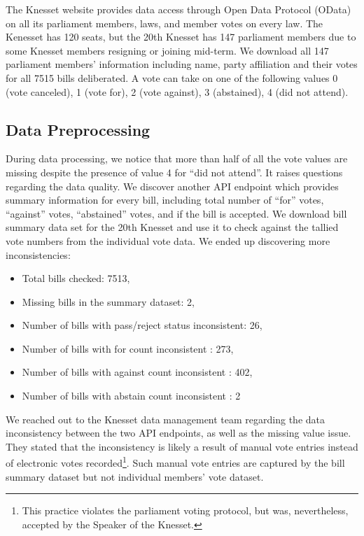 The Knesset website provides data access through Open Data Protocol (OData)
on all its parliament members, laws, and member votes on every law.
The Kenesset has 120 seats, but the 20th Knesset has 147 parliament members
due to some Knesset members resigning or joining mid-term.
We download all 147 parliament members' information including name,
party affiliation and their votes for all 7515 bills deliberated.
A vote can take on one of the following values
0 (vote canceled), 1 (vote for), 2 (vote against),
3 (abstained), 4 (did not attend).

\subsection{Data Preprocessing}
\label{subsec:data_preprocessing}

During data processing, we notice that more than half of all the vote values
are missing despite the presence of value 4 for ``did not attend''.
It raises questions regarding the data quality.
We discover another API endpoint which provides summary information for
every bill, including total number of ``for'' votes, ``against'' votes,
``abstained'' votes, and if the bill is accepted.
We download bill summary data set for the 20th Knesset and use it
to check against the tallied vote numbers from the individual vote data.
We ended up discovering more inconsistencies:

\begin{itemize}
  \item Total bills checked: 7513,
  \item Missing bills in the summary dataset: 2,
  \item Number of bills with pass/reject status inconsistent: 26,
  \item Number of bills with for count inconsistent : 273,
  \item Number of bills with against count inconsistent : 402,
  \item Number of bills with abstain count inconsistent : 2
\end{itemize}

We reached out to the Knesset data management team regarding the data inconsistency between
the two API endpoints, as well as the missing value issue.
They stated that the inconsistency
is likely a result of manual vote entries instead of electronic votes recorded\footnote{This practice violates the parliament voting protocol, but was, nevertheless, accepted by the Speaker of the Knesset.}.
Such manual vote entries are captured by the bill summary dataset but not individual members' vote dataset.

